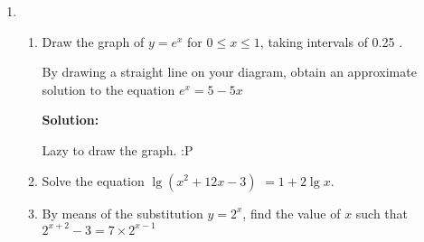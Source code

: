 \documentclass{report}
\newcommand{\sol}{\vspace{0.2cm}\textbf{Solution:}\vspace{0.2cm}}
\begin{document}
\begin{multicols*}{2}
\begin{enumerate}[leftmargin=*]
\begin{enumerate}
                  \item Given that $\lg x=a$ and $\lg y=b$, express $\lg$ $\sqrt{\dfrac{1000 x^3}{y}}$
                        in terms of $a$ and $b$.

                        \sol{}
                        \begin{align*}
                            \lg \sqrt{\dfrac{1000 x^3}{y}} & = \dfrac{1}{2} \lg \dfrac{1000 x^3}{y}        \\
                                                           & = \dfrac{1}{2} (\lg 1000 + \lg x^3 - \lg y)   \\
                                                           & = \dfrac{1}{2} (3 + 3a - b)                   \\
                                                           & = \dfrac{3}{2} + \dfrac{3a}{2} - \dfrac{b}{2}
                        \end{align*}

                  \item Sketch the graph of $y=e^{2 x}$, for $-1 \leq x \leq 2$, and state the
                        coordinates of the point where the graph crosses the $y$-axis.

                        \sol{}

                        Lazy to draw the graph. :P

                  \item Sketch the graph of $y=\ln 3 x$, for $0 \leq x \leq 2$, and state the
                        coordinates of the point where the graph crosses the $x$ - axis.

                        \sol{}

                        Lazy to draw the graph. :P
              \end{enumerate}

        \item \begin{enumerate}
                  \item Draw the graph of $y=e^x$ for $0 \leq x \leq 1$, taking intervals of 0.25 .

                        By drawing a straight line on your diagram, obtain an approximate solution to
                        the equation $e^{x}=5-5 x$

                        \sol{}

                        Lazy to draw the graph. :P

                  \item Solve the equation $\lg \left(x^2+12 x-3\right)$ $=1+2 \lg x$.
                  \item By means of the substitution $y=2^x$, find the value of $x$ such that
                        $2^{x+2}-3=7 \times 2^{x-1}$


\end{enumerate}
\end{enumerate}
\end{multicols*}
\end{document}
